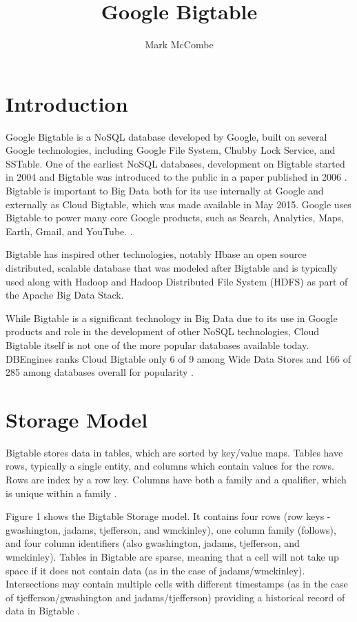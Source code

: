 \documentclass[9pt,twocolumn,twoside]{styles/osajnl}
\title{Google Bigtable}
\author[1,*]{Mark McCombe}
\affil[1]{School of Informatics and Computing, Bloomington, IN 47408, U.S.A.}
\affil[*]{Corresponding authors: mmccombe@iu.edu}
\begin{document}
\maketitle

\section{Introduction}

Google Bigtable is a NoSQL database developed by Google, built on several Google technologies, including Google File System, Chubby Lock Service, and SSTable\cite{www-wikibigtable}.  One of the earliest NoSQL databases, development on Bigtable started in 2004 and Bigtable was introduced to the public in a paper published in 2006 \cite{introbigtable}. Bigtable is important to Big Data both for its use internally at Google and externally as Cloud Bigtable, which was made available in May 2015. Google uses Bigtable to power many core Google products, such as Search, Analytics, Maps, Earth, Gmail, and YouTube. \cite{www-wikibigtable}.

Bigtable has inspired other technologies, notably Hbase \cite{www-hbase} an open source distributed, scalable database that was modeled after Bigtable and is typically used along with Hadoop and Hadoop Distributed File System (HDFS) as part of the Apache Big Data Stack.

While Bigtable is a significant technology in Big Data due to its use in Google products and role in the development of other NoSQL technologies, Cloud Bigtable itself is not one of the more popular databases available today.  DBEngines ranks Cloud Bigtable only 6 of 9 among Wide Data Stores and 166 of 285 among databases overall for popularity \cite{www-dbengines}.

\section{Storage Model}

Bigtable stores data in tables, which are sorted by key/value maps. Tables have rows, typically a single entity, and columns which contain values for the rows. Rows are index by a row key. Columns have both a family and a qualifier, which is unique within a family \cite{www-bigtabledocoverview}.

Figure 1 shows the Bigtable Storage model. It contains four rows (row keys - gwashington, jadams, tjefferson, and wmckinley), one column family (follows), and four column identifiers (also gwashington, jadams, tjefferson, and wmckinley). Tables in Bigtable are sparse, meaning that a cell will not take up space if it does not contain data (as in the case of jadams/wmckinley).  Intersections may contain multiple cells with different timestamps (as in the case of tjefferson/gwashington and jadams/tjefferson) providing a historical record of data in Bigtable \cite{www-bigtabledocoverview}.
\end{document}
